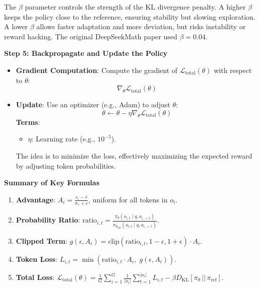 \documentclass{article}
\begin{document}
\begin{itemize}
The $\beta$ parameter controls the strength of the KL divergence penalty. A higher $\beta$ keeps the policy close to the reference, ensuring stability but slowing exploration. A lower $\beta$ allows faster adaptation and more deviation, but risks instability or reward hacking. The original DeepSeekMath paper used $\beta= 0.04$.

\end{itemize}





\vspace{3mm}

\noindent\textbf{Step 5: Backpropagate and Update the Policy} \\
\begin{itemize}
    \item \textbf{Gradient Computation}: Compute the gradient of \( \mathcal{L}_{\text{total}}(\theta) \) with respect to \( \theta \):
\[
\nabla_\theta \mathcal{L}_{\text{total}}(\theta)
\]
\item \textbf{Update}: Use an optimizer (e.g., Adam) to adjust \( \theta \):
\[
\theta \leftarrow \theta - \eta \nabla_\theta \mathcal{L}_{\text{total}}(\theta)
\]
\textbf{Terms}:
\begin{itemize}
    \item \( \eta \): Learning rate (e.g., \( 10^{-5} \)).
\end{itemize}
The idea is to minimize the loss, effectively maximizing the expected reward by adjusting token probabilities.
\end{itemize}




\noindent\textbf{Summary of Key Formulas}
\begin{enumerate}
    \item \textbf{Advantage}: \( A_i = \frac{r_i - \bar{r}}{\sigma_r + \epsilon} \), uniform for all tokens in \( o_i \).
    \item \textbf{Probability Ratio}: \( \text{ratio}_{i,t} = \frac{\pi_\theta(o_{i,t} \mid q, o_{i,<t})}{\pi_{\theta_{\text{old}}}(o_{i,t} \mid q, o_{i,<t})} \).
    \item \textbf{Clipped Term}: \( g(\epsilon, A_i) = \text{clip}(\text{ratio}_{i,t}, 1 - \epsilon, 1 + \epsilon) \cdot A_i \).
    \item \textbf{Token Loss}: \( L_{i,t} = \min \left( \text{ratio}_{i,t} \cdot A_i, \; g(\epsilon, A_i) \right) \).
    \item \textbf{Total Loss}: \( \mathcal{L}_{\text{total}}(\theta) = \frac{1}{G} \sum_{i=1}^{G} \frac{1}{|o_i|} \sum_{t=1}^{|o_i|} L_{i,t} - \beta D_{\text{KL}}[\pi_\theta \,||\, \pi_{\text{ref}}] \).
\end{enumerate}
\end{document}
